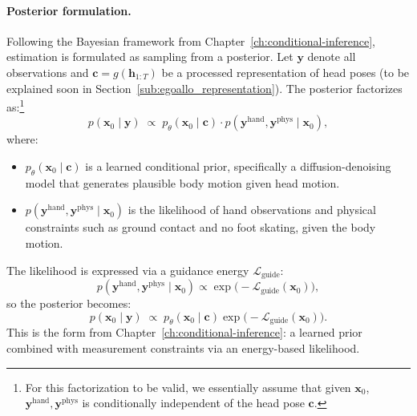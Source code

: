 \paragraph{Posterior formulation.}
Following the Bayesian framework from
Chapter~\ref{ch:conditional-inference}, estimation is formulated as
sampling from a posterior. Let $\boldsymbol{y}$ denote all observations
and $\boldsymbol{c} = g(\boldsymbol{h}_{1:T})$ be a processed representation of
head poses (to be explained soon in
Section~\ref{sub:egoallo_representation}). The posterior factorizes
as:\footnote{For this factorization to be valid, we essentially
    assume that given $\boldsymbol{x}_0$, $\boldsymbol{y}^{\text{hand}},
    \boldsymbol{y}^{\text{phys}}$ is conditionally independent of the head
pose $\boldsymbol{c}$.}
\begin{equation}
    p(\boldsymbol{x}_0 \mid \boldsymbol{y}) \;\propto\; p_\theta(\boldsymbol{x}_0 \mid
    \boldsymbol{c}) \cdot p(\boldsymbol{y}^{\text{hand}},
    \boldsymbol{y}^{\text{phys}} \mid \boldsymbol{x}_0),
\end{equation}
where:
\begin{itemize}
    \item $p_\theta(\boldsymbol{x}_0 \mid \boldsymbol{c})$ is a learned conditional
        prior, specifically a diffusion-denoising model that
        generates plausible body motion given head motion.
    \item $p(\boldsymbol{y}^{\text{hand}}, \boldsymbol{y}^{\text{phys}} \mid
        \boldsymbol{x}_0)$ is the likelihood of hand observations and
        physical constraints such as ground contact and no foot
        skating, given the body motion.
\end{itemize}

The likelihood is expressed via a guidance energy $\mathcal{L}_{\text{guide}}$:
\begin{equation}
    p(\boldsymbol{y}^{\text{hand}}, \boldsymbol{y}^{\text{phys}} \mid
    \boldsymbol{x}_0) \propto \exp\big(-\mathcal{L}_{\text{guide}}(\boldsymbol{x}_0)\big),
\end{equation}
so the posterior becomes:
\begin{equation}
    \label{eq:egoallo_posterior}
    p(\boldsymbol{x}_0 \mid \boldsymbol{y}) \;\propto\; p_\theta(\boldsymbol{x}_0 \mid
    \boldsymbol{c}) \exp\big(-\mathcal{L}_{\text{guide}}(\boldsymbol{x}_0)\big).
\end{equation}
This is the form from Chapter~\ref{ch:conditional-inference}: a
learned prior combined with measurement constraints via an
energy-based likelihood.

